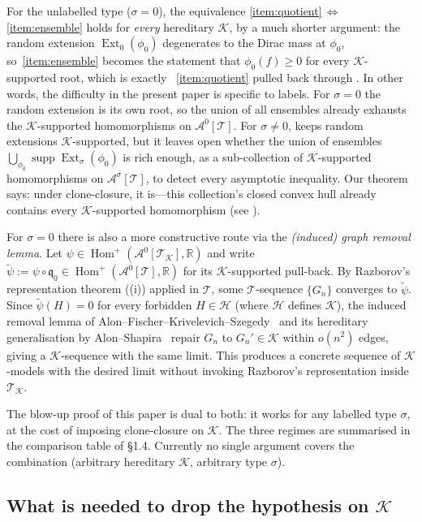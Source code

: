 \documentclass[11pt]{article}
\theoremstyle{definition}
\newcommand{\R}{\mathbb{R}}
\newcommand{\A}{\mathcal{A}}
\newcommand{\K}{\mathcal{K}}
\newcommand{\T}{\mathcal{T}}
\newcommand{\Homp}{\operatorname{Hom}^{+}}
\newcommand{\Ext}{\operatorname{Ext}}
\newcommand{\q}{\mathfrak{q}}
\begin{document}
For the unlabelled type ($\sigma=0$), the equivalence
\ref{item:quotient}$\,\Leftrightarrow\,$\ref{item:ensemble} holds for
\emph{every} hereditary $\K$, by a much shorter argument: the random
extension $\Ext_0(\phi_0)$ degenerates to the Dirac mass at $\phi_0$,
so~\ref{item:ensemble} becomes the statement that
$\phi_0(f)\ge 0$ for every $\K$-supported root, which is exactly
~\ref{item:quotient} pulled back through
.  In other words, the difficulty in the
present paper is specific to labels.  For $\sigma=0$ the random
extension is its own root, so the union of all ensembles already
exhausts the $\K$-supported homomorphisms on $\A^0[\T]$.  For
$\sigma\neq 0$,  keeps random extensions
$\K$-supported, but it leaves open whether the union of ensembles
$\bigcup_{\phi_0}\operatorname{supp}\Ext_\sigma(\phi_0)$ is rich
enough, as a sub-collection of $\K$-supported homomorphisms on
$\A^\sigma[\T]$, to detect every asymptotic inequality.  Our theorem
says: under clone-closure, it is---this collection's closed convex hull
already contains every $\K$-supported homomorphism (see
).

For $\sigma=0$ there is also a more constructive route via the
\emph{(induced) graph removal lemma}.  Let
$\psi\in\Homp(\A^0[\T_\K],\R)$ and write
$\widetilde\psi:=\psi\circ\q_0\in\Homp(\A^0[\T],\R)$ for its
$\K$-supported pull-back.  By Razborov's representation theorem
((i)) applied in $\T$, some $\T$-sequence $\{G_n\}$
converges to $\widetilde\psi$.  Since $\widetilde\psi(H)=0$ for every
forbidden $H\in\mathcal H$ (where $\mathcal H$ defines $\K$), the
induced removal lemma of
Alon--Fischer--Krivelevich--Szegedy~\cite{AFKS2000} and its hereditary
generalisation by Alon--Shapira~\cite{AlonShapira2008} repair $G_n$ to
$G_n'\in\K$ within $o(n^2)$ edges, giving a $\K$-sequence with the same
limit.  This produces a concrete sequence of $\K$-models with the
desired limit without invoking Razborov's representation inside
$\T_\K$.

The blow-up proof of this paper is dual to both: it works for any
labelled type $\sigma$, at the cost of imposing clone-closure on $\K$.
The three regimes are summarised in the comparison table of \S1.4.
Currently no single argument covers the combination
(arbitrary hereditary $\K$, arbitrary type $\sigma$).

\subsection{What is needed to drop the hypothesis on \texorpdfstring{$\K$}{K}}
\end{document}
